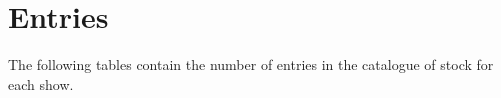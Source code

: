 \appendix
\chapter*{Entries}
The following tables contain the number of entries in the catalogue of stock for each show.
\addtolength{\textwidth}{-3cm}
\addtolength{\oddsidemargin}{1.5cm}


%
%
%
%
